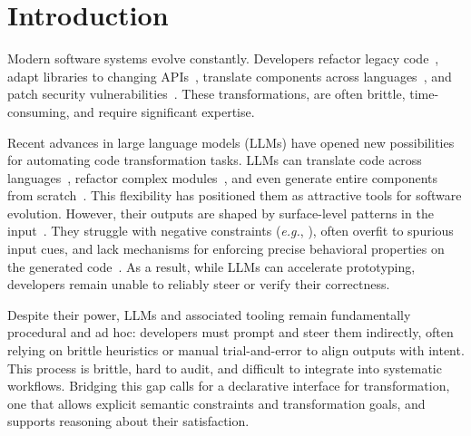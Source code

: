 \documentclass[sigplan]{acmart}
\def\eg{{\em e.g.}, }
\begin{document}
\section{Introduction}


Modern software systems evolve constantly.
Developers refactor legacy code~\cite{Fowler99,Mens04,facebook2010redesigns,dropbox2014syncengine},
adapt libraries to changing APIs~\cite{dig2005role,kula2017empiricalstudyimpactrefactoring},
translate components across languages~\cite{manzoor_cli_python,gaultier_rewrite_cpp},
and patch security vulnerabilities~\cite{ikegami2022userefactoringsecurityvulnerability,schneier2013security_vulnerabilities}.
These transformations, are often brittle, time-consuming, and require significant expertise.

Recent advances in large language models (LLMs) have opened new possibilities for automating code transformation tasks.
LLMs can translate code across languages~\cite{ou2025enhancingllmbasedcodetranslation},
refactor complex modules~\cite{ziftci2025migrating},
and even generate entire components from scratch~\cite{huynh2025largelanguagemodelscode}.
This flexibility has positioned them as attractive tools for software evolution.
However, their outputs are shaped by surface-level patterns in the input~\cite{yang2025evaluatinggeneralizationcapabilitieslarge}.
They struggle with negative constraints (\eg {}), often overfit to spurious input cues, and lack mechanisms for enforcing precise behavioral properties on the generated code~\cite{xu2023llmfoolitselfpromptbased, wu2023deceptpromptexploitingllmdrivencode,jiang2024llmsdreamelephantswhen,hwang2024thinkpinkelephant,roh2025breakthechainreasoningfailuresllms}.
As a result, while LLMs can accelerate prototyping, developers remain unable to reliably steer or verify their correctness.


Despite their power, LLMs and associated tooling remain fundamentally
procedural and ad hoc: developers must prompt and steer them indirectly, often
relying on brittle heuristics or manual trial-and-error to align outputs with
intent.
This process is brittle, hard to audit, and difficult to integrate into systematic workflows.
Bridging this gap calls for a declarative interface for transformation, one that allows explicit semantic constraints and transformation goals, and supports reasoning about their satisfaction.
\end{document}
